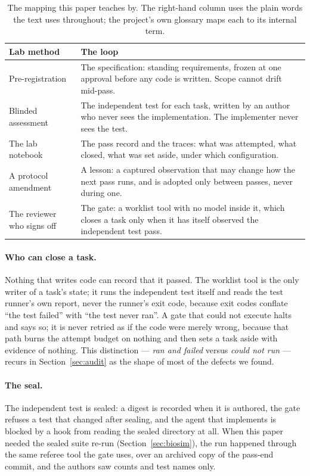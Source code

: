 \documentclass[10pt]{article}
\begin{document}
\begin{table}[h]
\centering
\small
\begin{tabular}{@{}p{4.2cm}p{9.6cm}@{}}  %
\toprule
Lab method & The loop \\
\midrule
Pre-registration & The specification: standing requirements, frozen at one approval before any code is written. Scope cannot drift mid-pass. \\
Blinded assessment & The independent test for each task, written by an author who never sees the implementation. The implementer never sees the test. \\
The lab notebook & The pass record and the traces: what was attempted, what closed, what was set aside, under which configuration. \\
A protocol amendment & A lesson: a captured observation that may change how the next pass runs, and is adopted only between passes, never during one. \\
The reviewer who signs off & The gate: a worklist tool with no model inside it, which closes a task only when it has itself observed the independent test pass. \\
\bottomrule
\end{tabular}
\caption{The mapping this paper teaches by. The right-hand column uses the plain words the text uses throughout; the project's own glossary maps each to its internal term.}
\label{tab:mapping}
\end{table}

\paragraph{Who can close a task.} Nothing that writes code can record that it passed. The worklist tool is the only writer of a task's state; it runs the independent test itself and reads the test runner's own report, never the runner's exit code, because exit codes conflate ``the test failed'' with ``the test never ran''. A gate that could not execute halts and says so; it is never retried as if the code were merely wrong, because that path burns the attempt budget on nothing and then sets a task aside with evidence of nothing. This distinction --- \emph{ran and failed} versus \emph{could not run} --- recurs in Section~\ref{sec:audit} as the shape of most of the defects we found.

\paragraph{The seal.} The independent test is sealed: a digest is recorded when it is authored, the gate refuses a test that changed after sealing, and the agent that implements is blocked by a hook from reading the sealed directory at all. When this paper needed the sealed suite re-run (Section~\ref{sec:biosim}), the run happened through the same referee tool the gate uses, over an archived copy of the pass-end commit, and the authors saw counts and test names only.
\end{document}
